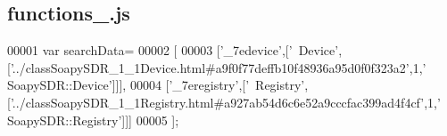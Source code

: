 \subsection{functions\+\_.\+js}
\label{functions__10_8js_source}

\begin{DoxyCode}
00001 var searchData=
00002 [
00003   [\textcolor{stringliteral}{'\_7edevice'},[\textcolor{stringliteral}{'~Device'},[\textcolor{stringliteral}{'../classSoapySDR\_1\_1Device.html#a9f0f77deffb10f48936a95d0f0f323a2'},1,\textcolor{stringliteral}{'
      SoapySDR::Device'}]]],
00004   [\textcolor{stringliteral}{'\_7eregistry'},[\textcolor{stringliteral}{'~Registry'},[\textcolor{stringliteral}{'../classSoapySDR\_1\_1Registry.html#a927ab54d6c6e52a9cccfac399ad4f4cf'},1,\textcolor{stringliteral}{'
      SoapySDR::Registry'}]]]
00005 ];
\end{DoxyCode}
